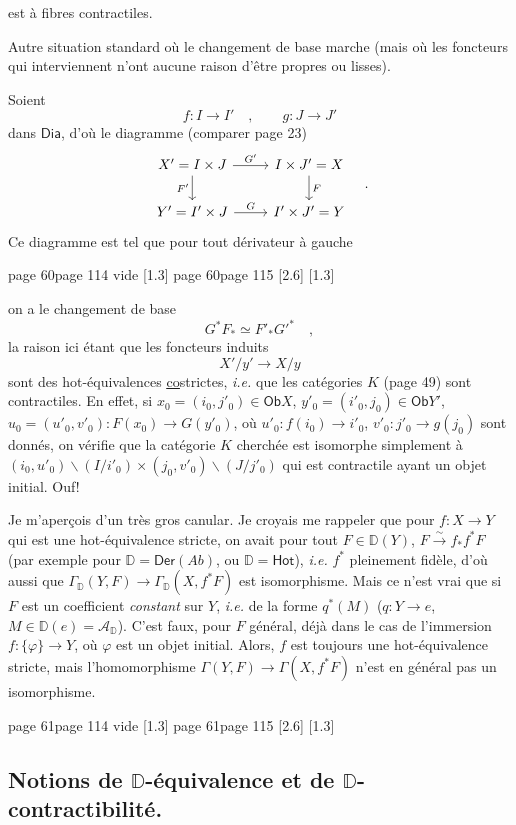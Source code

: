 \documentclass[11pt,leqno]{article}
\newcommand{\printedpage}[1]{\marginnote{\scriptsize\sffamily ed.\ #1}}
\newcommand{\msp}[1]{%
  \begingroup\def\thismsp{#1}\def\blankmsp{page 114 vide}%
  \ifx\thismsp\blankmsp
    \marginnote{\scriptsize\sffamily [114: vide]}[1.3\baselineskip]%
  \else\def\followingmsp{page 115}%
    \ifx\thismsp\followingmsp
      \marginnote{\scriptsize\sffamily [page 115]}[2.6\baselineskip]%
    \else\marginnote{\scriptsize\sffamily [#1]}[1.3\baselineskip]\fi
  \fi\endgroup}
\newcommand{\DD}{\ensuremath{\mathbb{D}}}
\newcommand{\cA}{\ensuremath{\mathcal{A}}}
\newcommand{\Dia}{\ensuremath{\mathsf{Dia}}}
\newcommand{\Ob}{\ensuremath{\mathsf{Ob}}}
\newcommand{\Hot}{\ensuremath{\mathsf{Hot}}}
\newcommand{\isoto}{\overset{\sim}{\to}}
\begin{document}
\printedpage{34}
\noindent est à fibres contractiles.

Autre situation standard où le changement de base marche (mais où les foncteurs qui interviennent n'ont aucune raison d'être propres ou lisses).

Soient
\[
f : I \longrightarrow I' \quad , \qquad g : J \longrightarrow J'
\]
dans $\Dia$, d'où le diagramme (comparer page 23)
\[
\begin{tikzcd}
X' = I \times J \arrow[r, "G'"] \arrow[d, "F'"'] & I \times J' = X \arrow[d, "F"] \\
Y' = I' \times J \arrow[r, "G"] & I' \times J' = Y
\end{tikzcd}
\quad .
\]
Ce diagramme est tel que pour tout dérivateur à gauche

\noindent\msp{page 60}

{\raggedright
\noindent on a le changement de base
\[
G^*F_* \simeq F'_*{G'}^* \quad ,
\]
la raison ici étant que les foncteurs induits
\[
X'/y' \longrightarrow X/y
\]
sont des hot-équivalences \underline{\underline{co}}strictes, \textit{i.e.} que les catégories $K$ (page 49) sont contractiles. En effet, si $x_0 = (i_0, j'_0) \in \Ob X$, $y'_0 = (i'_0, j_0) \in \Ob Y'$, $u_0 = (u'_0, v'_0) : F(x_0) \to G(y'_0)$, où $u'_0 : f(i_0) \to i'_0$, $v'_0 : j'_0 \to g(j_0)$ sont donnés, on vérifie que la catégorie $K$ cherchée est isomorphe simplement à $(i_0, u'_0)\backslash(I/i'_0) \times (j_0, v'_0)\backslash(J/j'_0)$ qui est contractile ayant un objet initial. Ouf!\par}

Je m'aperçois d'un très gros canular. Je croyais me rappeler que pour $f : X \to Y$ qui est une hot-équivalence stricte, on avait pour tout $F \in \DD(Y)$, $F \isoto f_*f^*F$ (par exemple pour $\DD = \mathsf{Der}(\mathit{Ab})$, ou $\DD = \Hot$), \textit{i.e.} $f^*$ pleinement fidèle, d'où aussi que $\Gamma_{\DD}(Y, F) \to \Gamma_{\DD}(X, f^*F)$ est isomorphisme. Mais ce n'est vrai que si $F$ est un coefficient \textit{constant} sur $Y$, \textit{i.e.} de la forme $q^*(M)$ ($q : Y \to e$, $M \in \DD(e) = \cA_{\DD}$). C'est faux, pour $F$ général, déjà dans le cas de l'immersion $f : \{\varphi\} \to Y$, où $\varphi$ est un objet initial. Alors, $f$ est toujours une hot-équivalence stricte, mais l'homomorphisme $\Gamma(Y, F) \to \Gamma(X, f^*F)$ n'est en général pas un isomorphisme.

\clearpage
\printedpage{35}
\noindent\msp{page 61}

\subsection*{Notions de $\mathbb{D}$-équivalence et de $\mathbb{D}$-contractibilité.}
\end{document}
